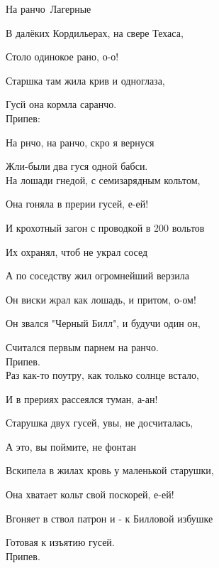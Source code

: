 \documentclass[11pt,a5paper]{book}
\renewcommand{\tt}{\indent \indent}
\begin{document}
\begin{song}{На ранчо}{}{~}{Лагерные}{}{}

В  далёких Кордильерах, на свере Техаса,\par
Столо одинокое рано, о-о!\par
Старшка там жила крив и одноглаза,\par
Гусй она кормла саранчо.\\

Припев:\par
\tt             На рнчо, на ранчо, скро я вернуся\par
\tt             Жли-были два гуся  одной бабси.\\

На лошади гнедой, с семизарядным кольтом,\par
Она гоняла в прерии гусей, е-ей!\par
И крохотный загон с проводкой в 200 вольтов \par
Их охранял, чтоб не украл сосед \par
А по соседству жил огромнейший верзила \par
Он виски жрал как лошадь, и притом, о-ом!\par
Он звался "Черный Билл", и будучи один он,\par
Считался первым парнем на ранчо.\\

Припев.\\

Раз как-то поутру, как только солнце встало,\par
И в прериях рассеялся туман, а-ан!\par
Старушка двух гусей, увы, не досчиталась,\par
А это, вы поймите, не фонтан\par
Вскипела в жилах кровь у маленькой старушки,\par
Она хватает кольт свой поскорей, е-ей!\par
Вгоняет в ствол патрон и - к Билловой избушке\par
Готовая к изъятию гусей.\\

Припев.\\


\end{song}
\end{document}
